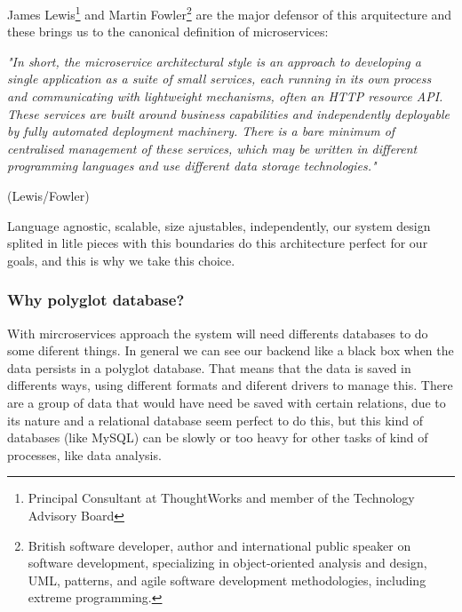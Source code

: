 \noindent James Lewis\footnote{Principal Consultant at ThoughtWorks and
member of the Technology Advisory Board} and Martin Fowler\footnote{British software developer,
author and international public speaker on software development, specializing in
object-oriented analysis and design, UML, patterns, and agile software development
methodologies, including extreme programming.} are the major defensor of this
arquitecture and these brings us to the canonical definition of microservices:
\bigskip

\begin{minipage}{0.9\linewidth}
        \vspace{5pt}%
        {\small
        \textit{"In short, the microservice architectural style is an approach to developing a
        single application as a suite of small services, each running in its own process
        and communicating with lightweight mechanisms, often an HTTP resource API.
        These services are built around business capabilities and independently deployable
        by fully automated deployment machinery. There is a bare minimum of centralised management
        of these services, which may be written in different programming languages and
        use different data storage technologies."}
        }
        \begin{flushright}
            (Lewis/Fowler)
        \end{flushright}
        \vspace{5pt}%
    \end{minipage}


\noindent Language agnostic, scalable, size ajustables, independently, our system design
splited in litle pieces with this boundaries do this architecture perfect for
our goals, and this is why we take this choice.

\subsubsection{Why polyglot database?}

With mircroservices approach the system will need differents databases to do
some diferent things. In general we can see our
backend like a black box when the data persists in a polyglot database.
That means that the data is saved in differents ways, using different
formats and diferent drivers to manage this. There are a group of
data that would have need be saved with certain relations, due to its nature
and a relational database seem perfect to do this, but this kind of
databases (like MySQL) can be slowly or too heavy for other tasks
of kind of processes, like data analysis.


